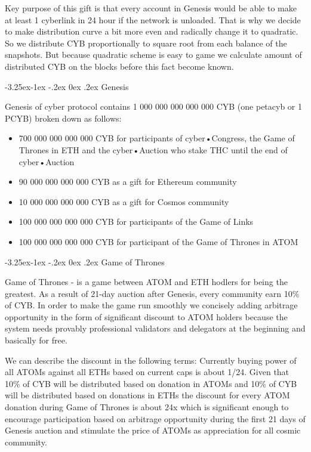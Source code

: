 \documentclass[8pt,oneside]{amsart}
\makeatletter
\renewcommand\subsection{\@startsection{subsection}{2}{\z@}%
                                     {-3.25ex\@plus -1ex \@minus -.2ex}%
                                     {0ex \@plus .2ex}%
                                     {\play\Large}}%
\newcommand{\titleSection}[1]{\subsection{#1}}
\newcommand{\code}[1]{{\PlayBold #1}}
\newenvironment{Figure}
  {\par\medskip\noindent\minipage{\linewidth}}
  {\endminipage\par\medskip}
\makeatother
\begin{document}
Key purpose of this gift is that every account in Genesis would be able to make at least 1 cyberlink in 24 hour if the network is unloaded. That is why we decide to make distribution curve a bit more even and radically change it to quadratic. So we distribute CYB proportionally to square root from each balance of the snapshots. But because quadratic scheme is easy to game we calculate amount of distributed CYB on the blocks before this fact become known.

\titleSection{Genesis}\label{genesis}

Genesis of \code{cyber} protocol contains 1 000 000 000 000 000 CYB (one petacyb or 1 PCYB) broken down as follows:

\begin{itemize}
\item 700 000 000 000 000 CYB for participants of cyber•Congress, the Game of Thrones in ETH and the cyber•Auction who stake THC until the end of cyber•Auction
\item 90 000 000 000 000 CYB as a gift for Ethereum community
\item 10 000 000 000 000 CYB as a gift for Cosmos community
\item 100 000 000 000 000 CYB for participants of the Game of Links
\item 100 000 000 000 000 CYB for participant of the Game of Thrones in ATOM

\end{itemize}

\begin{Figure}
 \centering
 
\end{Figure}

\titleSection{Game of Thrones}\label{got}

Game of Thrones - is a game between ATOM and ETH hodlers for being the greatest. As a result of 21-day auction after Genesis, every community earn 10\% of CYB. In order to make the game run smoothly we concisely adding arbitrage opportunity in the form of significant discount to ATOM holders because the system needs provably professional validators and delegators at the beginning and basically for free.

We can describe the discount in the following terms: Currently buying power of all ATOMs against all ETHs based on current caps is about 1/24. Given that 10\% of CYB will be distributed based on donation in ATOMs and 10\% of CYB will be distributed based on donations in ETHs the discount for every ATOM donation during Game of Thrones is about 24x which is significant enough to encourage participation based on arbitrage opportunity during the first 21 days of Genesis auction and stimulate the price of ATOMs as appreciation for all cosmic community.
\end{document}
